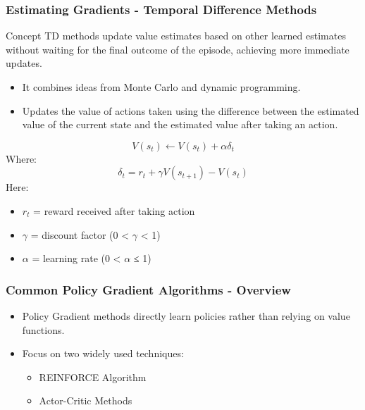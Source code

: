 \documentclass[aspectratio=169]{beamer}
\begin{document}
\begin{frame}[fragile]
    \frametitle{Estimating Gradients - Temporal Difference Methods}
    \begin{block}{Concept}
        TD methods update value estimates based on other learned estimates without waiting for the final outcome of the episode, achieving more immediate updates.
    \end{block}

    \begin{itemize}
        \item It combines ideas from Monte Carlo and dynamic programming.
        \item Updates the value of actions taken using the difference between the estimated value of the current state and the estimated value after taking an action.
    \end{itemize}

    \begin{equation}
        V(s_t) \leftarrow V(s_t) + \alpha \delta_t
    \end{equation}
    Where:
    \begin{equation}
        \delta_t = r_t + \gamma V(s_{t+1}) - V(s_t)
    \end{equation}
    Here:
    \begin{itemize}
        \item $r_t$ = reward received after taking action
        \item $\gamma$ = discount factor (0 < $\gamma$ < 1)
        \item $\alpha$ = learning rate (0 < $\alpha$ ≤ 1)
    \end{itemize}
\end{frame}

\begin{frame}[fragile]
    \frametitle{Common Policy Gradient Algorithms - Overview}
    \begin{itemize}
        \item Policy Gradient methods directly learn policies rather than relying on value functions.
        \item Focus on two widely used techniques:
        \begin{itemize}
            \item REINFORCE Algorithm
            \item Actor-Critic Methods
        \end{itemize}
    \end{itemize}
\end{frame}
\end{document}

